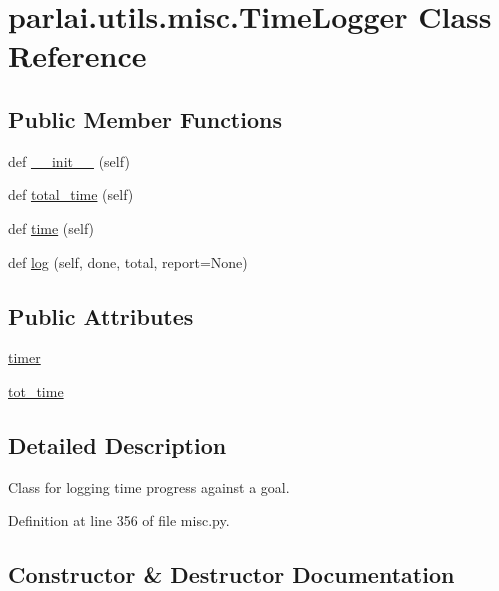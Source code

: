 \hypertarget{classparlai_1_1utils_1_1misc_1_1TimeLogger}{}\section{parlai.\+utils.\+misc.\+Time\+Logger Class Reference}
\label{classparlai_1_1utils_1_1misc_1_1TimeLogger}
\subsection*{Public Member Functions}
\begin{DoxyCompactItemize}
\item 
def \hyperlink{classparlai_1_1utils_1_1misc_1_1TimeLogger_a11aae5a0adf1f9081b5a454b79c89b89}{\+\_\+\+\_\+init\+\_\+\+\_\+} (self)
\item 
def \hyperlink{classparlai_1_1utils_1_1misc_1_1TimeLogger_a18d3faec4442ed5b313c88d566f43b2d}{total\+\_\+time} (self)
\item 
def \hyperlink{classparlai_1_1utils_1_1misc_1_1TimeLogger_aa8e859dc10c12159501bbf545ca62a51}{time} (self)
\item 
def \hyperlink{classparlai_1_1utils_1_1misc_1_1TimeLogger_a52458d882781ad6a6cbcea479ff495de}{log} (self, done, total, report=None)
\end{DoxyCompactItemize}
\subsection*{Public Attributes}
\begin{DoxyCompactItemize}
\item 
\hyperlink{classparlai_1_1utils_1_1misc_1_1TimeLogger_a7592e5ebb754f91e73b66b409fda2d77}{timer}
\item 
\hyperlink{classparlai_1_1utils_1_1misc_1_1TimeLogger_a831849f16f6779f8b77289c3caa65689}{tot\+\_\+time}
\end{DoxyCompactItemize}


\subsection{Detailed Description}
\begin{DoxyVerb}Class for logging time progress against a goal.
\end{DoxyVerb}
 

Definition at line 356 of file misc.\+py.



\subsection{Constructor \& Destructor Documentation}
\mbox{\label{classparlai_1_1utils_1_1misc_1_1TimeLogger_a11aae5a0adf1f9081b5a454b79c89b89}} 

